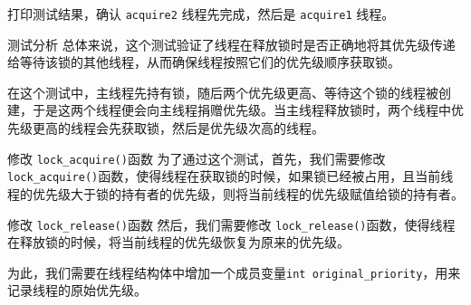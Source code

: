 \documentclass{beamer}
\begin{document}
\begin{frame}
  打印测试结果，确认 \texttt{acquire2} 线程先完成，然后是 \texttt{acquire1} 线程。

  \begin{block}{测试分析}
    总体来说，这个测试验证了线程在释放锁时是否正确地将其优先级传递给等待该锁的其他线程，从而确保线程按照它们的优先级顺序获取锁。
    \vspace{1em}

    在这个测试中，主线程先持有锁，随后两个优先级更高、等待这个锁的线程被创建，于是这两个线程便会向主线程捐赠优先级。当主线程释放锁时，两个线程中优先级更高的线程会先获取锁，然后是优先级次高的线程。
  \end{block}

  \framebreak

  \begin{block}{修改 \texttt{lock\_acquire()}函数}
    为了通过这个测试，首先，我们需要修改 \texttt{lock\_acquire()}函数，使得线程在获取锁的时候，如果锁已经被占用，且当前线程的优先级大于锁的持有者的优先级，则将当前线程的优先级赋值给锁的持有者。
  \end{block}

    
    


  \begin{block}{修改 \texttt{lock\_release()}函数}
    然后，我们需要修改 \texttt{lock\_release()}函数，使得线程在释放锁的时候，将当前线程的优先级恢复为原来的优先级。
  \end{block}

  为此，我们需要在线程结构体中增加一个成员变量\texttt{int original\_priority}，用来记录线程的原始优先级。
  
  \vspace{1em}
  
  

    

\end{frame}
\end{document}
